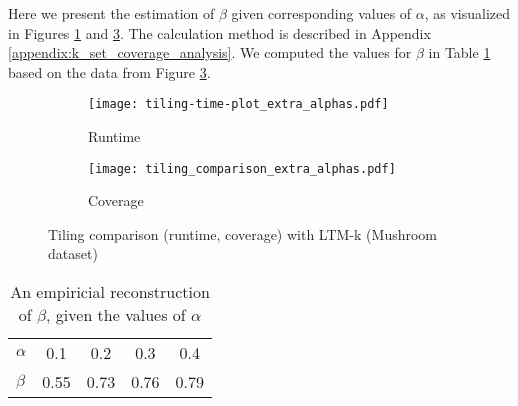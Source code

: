 Here we present the estimation of $\beta$ given corresponding values of $\alpha$, as visualized in Figures \ref{fig:tiling_time_comparison_extra_alphas} and \ref{fig:tiling_comparison_extra_alphas}. The calculation method is described in Appendix \ref{appendix:k_set_coverage_analysis}. We computed the values for $\beta$ in Table \ref{table:beta_alpha_dependency} based on the data from Figure \ref{fig:tiling_comparison_extra_alphas}.

\begin{figure}[htb]
      \captionsetup{
                   skip=-2pt
                 }
  \begin{center}
    \begin{subfigure}{.49\textwidth}
      \texttt{[image: tiling-time-plot\_extra\_alphas.pdf]}
      \caption{Runtime}
      \label{fig:tiling_time_comparison_extra_alphas}
    \end{subfigure}
    \hfill 
    \begin{subfigure}{.49\textwidth}
      \texttt{[image: tiling\_comparison\_extra\_alphas.pdf]}
      \caption{Coverage}
      \label{fig:tiling_comparison_extra_alphas}
    \end{subfigure}
  \caption{Tiling comparison (runtime, coverage) with LTM-k (Mushroom dataset)}
  \end{center}
\end{figure}

\begin{table}[htb]
  \centering
  \caption{An empiricial reconstruction of $\beta$, given the values of $\alpha$}
  \label{table:beta_alpha_dependency}
  \begin{tabular}{l | c c c c}
    $\alpha$ & 0.1 & 0.2 & 0.3 & 0.4\\
    $\beta$ & 0.55& 0.73 & 0.76 & 0.79 
  \end{tabular}
\end{table}


